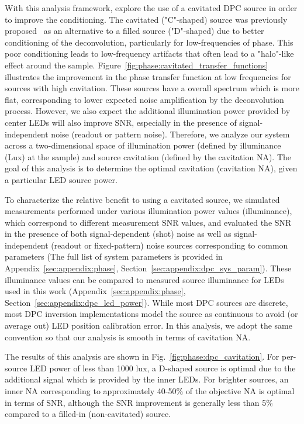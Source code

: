 With this analysis framework, explore the use of a cavitated DPC source in order to improve the conditioning. The cavitated ("C"-shaped) source was previously proposed~\cite{tian2015quantitative} as an alternative to a filled source ("D"-shaped) due to better conditioning of the deconvolution, particularly for low-frequencies of phase. This poor conditioning leads to low-frequency artifacts that often lead to a "halo"-like effect around the sample. Figure~\ref{fig:phase:cavitated_transfer_functions} illustrates the improvement in the phase transfer function at low frequencies for sources with high cavitation. These sources have a overall spectrum which is more flat, corresponding to lower expected noise amplification by the deconvolution process. However, we also expect the additional illumination power provided by center LEDs will also improve SNR, especially in the presence of signal-independent noise (readout or pattern noise). Therefore, we analyze our system across a two-dimensional space of illumination power (defined by illuminance (Lux) at the sample) and source cavitation (defined by the cavitation NA). The goal of this analysis is to determine the optimal cavitation (cavitation NA), given a particular LED source power.

To characterize the relative benefit to using a cavitated source, we simulated measurements performed under various illumination power values (illuminance), which correspond to different measurement SNR values, and evaluated the SNR in the presence of both signal-dependent (shot) noise as well as signal-independent (readout or fixed-pattern) noise sources corresponding to common parameters (The full list of system parameters is provided in Appendix~\ref{sec:appendix:phase}, Section~\ref{sec:appendix:dpc_sys_param}). These illuminance values can be compared to measured source illuminance for LEDs used in this work (Appendix~\ref{sec:appendix:phase}, Section~\ref{sec:appendix:dpc_led_power}). While most DPC sources are discrete, most DPC inversion implementations model the source as continuous to avoid (or average out) LED position calibration error. In this analysis, we adopt the same convention so that our analysis is smooth in terms of cavitation NA.

The results of this analysis are shown in Fig.~\ref{fig:phase:dpc_cavitation}. For per-source LED power of less than 1000 lux, a D-shaped source is optimal due to the additional signal which is provided by the inner LEDs. For brighter sources, an inner NA corresponding to approximately 40-50\% of the objective NA is optimal in terms of SNR, although the SNR improvement is generally less than 5\% compared to a filled-in (non-cavitated) source.

